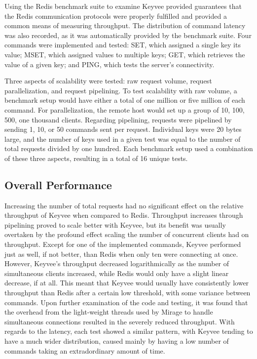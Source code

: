 \documentclass[english,10pt,twocolumn]{article}
\begin{document}
Using the Redis benchmark suite to examine Keyvee provided guarantees that the Redis communication protocols were properly fulfilled and provided a common means of measuring throughput.
The distribution of command latency was also recorded, as it was automatically provided by the benchmark suite.
Four commands were implemented and tested: SET, which assigned a single key its value; MSET, which assigned values to multiple keys; GET, which retrieves the value of a given key; and PING, which tests the server's connectivity.

Three aspects of scalability were tested: raw request volume, request parallelization, and request pipelining.
To test scalability with raw volume, a benchmark setup would have either a total of one million or five million of each command.
For parallelization, the remote host would set up a group of 10, 100, 500, one thousand clients.
Regarding pipelining, requests were pipelined by sending 1, 10, or 50 commands sent per request.
Individual keys were 20 bytes large, and the number of keys used in a given test was equal to the number of total requests divided by one hundred.
Each benchmark setup used a combination of these three aspects, resulting in a total of 16 unique tests.

\subsection{Overall Performance}

Increasing the number of total requests had no significant effect on the relative throughput of Keyvee when compared to Redis.
Throughput increases through pipelining proved to scale better with Keyvee, but its benefit was usually overtaken by the profound effect scaling the number of concurrent clients had on throughput.
Except for one of the implemented commands, Keyvee performed just as well, if not better, than Redis when only ten were connecting at once.
However, Keyvee's throughput decreased logarithmically as the number of simultaneous clients increased, while Redis would only have a slight linear decrease, if at all.
This meant that Keyvee would usually have consistently lower throughput than Redis after a certain low threshold, with some variance between commands.
Upon further examination of the code and testing, it was found that the overhead from the light-weight threads used by Mirage to handle simultaneous connections resulted in the severely reduced throughput.
With regards to the latency, each test showed a similar pattern, with Keyvee tending to have a much wider distribution, caused mainly by having a low number of commands taking an extradordinary amount of time.
\end{document}
